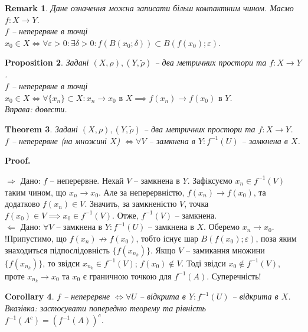 \documentclass[a4paper, 10pt]{article}
\makeatletter
\def\rightproof{$\boxed{\Rightarrow}$ }
\def\leftproof{$\boxed{\Leftarrow}$ }
\theoremstyle{theoremdd}
\newtheorem{theorem}{Theorem}[subsection]
\theoremstyle{theoremdd}
\theoremstyle{theoremdd}
\theoremstyle{theoremdd}
\theoremstyle{theoremdd}
\newtheorem{proposition}[theorem]{Proposition}
\theoremstyle{theoremdd}
\newtheorem{remark}[theorem]{Remark}
\theoremstyle{theoremdd}
\theoremstyle{theoremdd}
\newtheorem{corollary}[theorem]{Corollary}
\renewenvironment{proof}[1][Proof.\\]{\par
\pushQED{\hfill \qed}%
\normalfont \topsep6\p@\@plus6\p@\relax
\trivlist
\item\relax
{\bfseries
#1\@addpunct{.}}\hspace\labelsep\ignorespaces
}{%
\popQED\endtrivlist\@endpefalse
}
\makeatother
\begin{document}
\begin{remark}
Дане означення можна записати більш компактним чином. Маємо $f \colon X \to Y$.\\
$f$ -- неперервне в точці $x_0 \in X \iff \forall \varepsilon > 0: \exists \delta > 0: f(B(x_0;\delta)) \subset B(f(x_0);\varepsilon)$.
\end{remark}

\begin{proposition}
Задані $(X,\rho), (Y,\tilde{\rho})$ -- два метричних простори та $f \colon X \to Y$.\\
$f$ -- неперервне в точці $x_0 \in X \iff \forall \{x_n\} \subset X: x_n \to x_0 \text{ в } X \implies f(x_n) \to f(x_0) \text{ в } Y$.\\
\textit{Вправа: довести.}
\end{proposition}

\begin{theorem}
Задані $(X,\rho), (Y,\tilde{\rho})$ -- два метричних простори та $f \colon X \to Y$.\\
$f$ -- неперервне (на множині $X$) $\iff \forall V$ -- замкнена в $Y: f^{-1}(U)$ -- замкнена в $X$.
\end{theorem}

\begin{proof}
\rightproof Дано: $f$ -- неперервне. Нехай $V$ -- замкнена в $Y$. Зафіксуємо $x_n \in f^{-1}(V)$ таким чином, що $x_n \to x_0$. Але за неперервністю, $f(x_n) \to f(x_0)$, та додатково $f(x_n) \in V$. Значить, за замкненістю $V$, точка $f(x_0) \in V \implies x_0 \in f^{-1}(V)$. Отже, $f^{-1}(V)$ -- замкнена.
\bigskip \\
\leftproof Дано: $\forall V$ -- замкнена в $Y: f^{-1}(U)$ -- замкнена в $X$. Оберемо $x_n \to x_0$.\\
!Припустимо, що $f(x_n) \not\to f(x_0)$, тобто існує шар $B(f(x_0);\varepsilon)$, поза яким знаходиться підпослідовність $\{f(x_{n_k})\}$. Якщо $V$ -- замикання множини $\{f(x_{n_k})\}$, то звідси $x_{n_k} \in f^{-1}(V)$; $f(x_0) \notin V$. Тоді звідси $x_0 \notin f^{-1}(V)$, проте $x_{n_k} \to x_0$ та $x_0$ є граничною точкою для $f^{-1}(A)$. Суперечність!
\end{proof}

\begin{corollary}
$f$ -- неперервне $\iff \forall U$ -- відкрита в $Y: f^{-1}(U)$ -- відкрита в $X$.\\
\textit{Вказівка: застосувати попередню теорему та рівність $f^{-1}(A^c) = (f^{-1}(A))^c$.}
\end{corollary}
\end{document}
